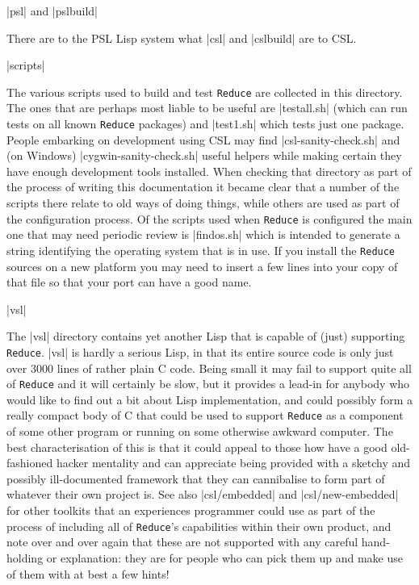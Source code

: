 \documentclass[12pt,twoside,openright]{memoir}
\newcommand{\reduce}{\texttt{Reduce}\xspace}
\begin{document}
\begin{description}
\item |psl| and |pslbuild|

There are to the PSL Lisp system what |csl| and |cslbuild| are to CSL.

\item |scripts|

The various scripts used to build and test \reduce are collected in this
directory. The ones that are perhaps most liable to be useful are
|testall.sh| (which can run tests on all known \reduce packages) and
|test1.sh| which tests just one package. People embarking on development
using CSL may find |csl-sanity-check.sh| and (on Windows)
|cygwin-sanity-check.sh| useful helpers while making certain they have
enough development tools installed. When checking that directory as part
of the process of writing this documentation it became clear that a number of
the scripts there relate to old ways of doing things, while others
are used as part of the configuration process. Of the scripts used when
\reduce is configured the main one that may need periodic review is
|findos.sh| which is intended to generate a string identifying the
operating system that is in use. If you install the \reduce sources on
a new platform you may need to insert a few lines into your copy
of that file so that your port can have a good name.

\item |vsl|

  The |vsl| directory contains yet another Lisp that is capable of (just)
  supporting \reduce. |vsl| is hardly a serious Lisp, in that its entire source
  code is only just over 3000 lines of rather plain C code. Being small it may
  fail to support quite all of \reduce and it will certainly be slow, but it
  provides a lead-in for anybody who would like to find out a bit about Lisp
  implementation, and could possibly form a really compact body of C that could
  be used to support \reduce as a component of some other program or running on
  some otherwise awkward computer. The best characterisation of this is that
  it could appeal to those how have a good old-fashioned hacker mentality and
  can appreciate being provided with a sketchy and possibly ill-documented
  framework that they can cannibalise to form part of whatever their own
  project is. See also |csl/embedded| and |csl/new-embedded| for other
  toolkits that an experiences programmer could use as part of the process
  of including all of \reduce's capabilities within their own product, and
  note over and over again that these are not supported with any careful
  hand-holding or explanation: they are for people who can pick them up and
  make use of them with at best a few hints!


\end{description}
\end{document}
